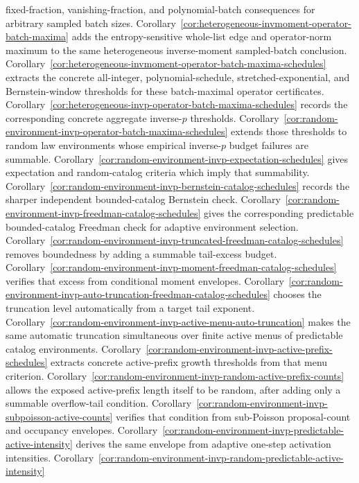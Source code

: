 \documentclass[11pt]{amsart}
\numberwithin{equation}{section}
\theoremstyle{definition}
\theoremstyle{remark}
\begin{document}
fixed-fraction, vanishing-fraction, and polynomial-batch consequences for
arbitrary sampled batch sizes.
Corollary~\ref{cor:heterogeneous-invmoment-operator-batch-maxima} adds the
entropy-sensitive whole-list edge and operator-norm maximum to the same
heterogeneous inverse-moment sampled-batch conclusion.
Corollary~\ref{cor:heterogeneous-invmoment-operator-batch-maxima-schedules}
extracts the concrete all-integer, polynomial-schedule, stretched-exponential,
and Bernstein-window thresholds for these batch-maximal operator certificates.
Corollary~\ref{cor:heterogeneous-invp-operator-batch-maxima-schedules}
records the corresponding concrete aggregate inverse-\(p\) thresholds.
Corollary~\ref{cor:random-environment-invp-operator-batch-maxima-schedules}
extends those thresholds to random law environments whose empirical
inverse-\(p\) budget failures are summable.
Corollary~\ref{cor:random-environment-invp-expectation-schedules} gives
expectation and random-catalog criteria which imply that summability.
Corollary~\ref{cor:random-environment-invp-bernstein-catalog-schedules}
records the sharper independent bounded-catalog Bernstein check.
Corollary~\ref{cor:random-environment-invp-freedman-catalog-schedules} gives
the corresponding predictable bounded-catalog Freedman check for adaptive
environment selection.
Corollary~\ref{cor:random-environment-invp-truncated-freedman-catalog-schedules}
removes boundedness by adding a summable tail-excess budget.
Corollary~\ref{cor:random-environment-invp-moment-freedman-catalog-schedules}
verifies that excess from conditional moment envelopes.
Corollary~\ref{cor:random-environment-invp-auto-truncation-freedman-catalog-schedules}
chooses the truncation level automatically from a target tail exponent.
Corollary~\ref{cor:random-environment-invp-active-menu-auto-truncation}
makes the same automatic truncation simultaneous over finite active menus of
predictable catalog environments.
Corollary~\ref{cor:random-environment-invp-active-prefix-schedules} extracts
concrete active-prefix growth thresholds from that menu criterion.
Corollary~\ref{cor:random-environment-invp-random-active-prefix-counts} allows
the exposed active-prefix length itself to be random, after adding only a
summable overflow-tail condition.
Corollary~\ref{cor:random-environment-invp-subpoisson-active-counts} verifies
that condition from sub-Poisson proposal-count and occupancy envelopes.
Corollary~\ref{cor:random-environment-invp-predictable-active-intensity}
derives the same envelope from adaptive one-step activation intensities.
Corollary~\ref{cor:random-environment-invp-random-predictable-active-intensity}
\end{document}

